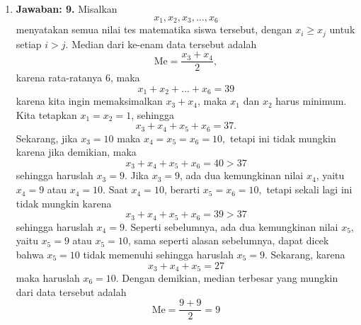 \begin{enumerate}
\item \textbf{Jawaban: 9.} Misalkan $$x_1,x_2,x_3,\ldots,x_6$$ menyatakan semua nilai tes matematika siswa tersebut, dengan $x_i\geq x_j$ untuk setiap $i>j$. Median dari ke-enam data tersebut adalah $$\text{Me} = \frac{x_3+x_4}{2},$$ karena rata-ratanya 6, maka $$x_1 + x_2 + \ldots +x_6 = 39$$karena kita ingin memaksimalkan $x_3+x_4$, maka $x_1$ dan $x_2$ harus minimum. Kita tetapkan $x_1 = x_2 = 1$, sehingga $$x_3 + x_4+x_5+x_6 = 37.$$Sekarang, jika $x_3 = 10$ maka $x_4=x_5=x_6 =10,$ tetapi ini tidak mungkin karena jika demikian, maka$$x_3+x_4+x_5+x_6 = 40 > 37$$ sehingga haruslah $x_3 = 9.$ Jika $x_3 = 9$, ada dua kemungkinan nilai $x_4$, yaitu $x_4 = 9$ atau $x_4 = 10$. Saat $x_4 = 10$, berarti $x_5 = x_6 = 10,$ tetapi sekali lagi ini tidak mungkin karena $$x_3+x_4+x_5+x_6 = 39 > 37$$sehingga haruslah $x_4 = 9.$ Seperti sebelumnya, ada dua kemungkinan nilai $x_5$, yaitu $x_5 = 9$ atau $x_5 = 10$, sama seperti alasan sebelumnya, dapat dicek bahwa $x_5 = 10$ tidak memenuhi sehingga haruslah $x_5 = 9$. Sekarang, karena $$x_3 + x_4 + x_5 = 27$$maka haruslah $x_6 = 10.$ Dengan demikian, median terbesar yang mungkin dari data tersebut adalah $$\text{Me} = \frac{9+9}{2} = 9$$

\end{enumerate}
